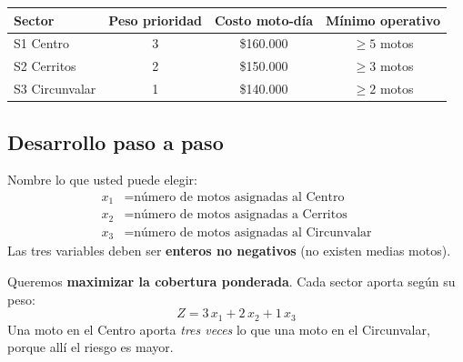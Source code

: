 \documentclass[11pt, a4paper]{article}
\begin{document}
\begin{center}
\begin{tabular}{@{}lccc@{}}
\toprule
\textbf{Sector} & \textbf{Peso prioridad} & \textbf{Costo moto-d\'ia} & \textbf{M\'inimo operativo} \\
\midrule
S1 Centro & 3 & \$160.000 & $\geq 5$ motos \\
S2 Cerritos & 2 & \$150.000 & $\geq 3$ motos \\
S3 Circunvalar & 1 & \$140.000 & $\geq 2$ motos \\
\bottomrule
\end{tabular}
\end{center}

\subsection{Desarrollo paso a paso}

\begin{cajaPaso}
Nombre lo que usted puede elegir:
\begin{align*}
x_1 &= \text{n\'umero de motos asignadas al Centro}\\
x_2 &= \text{n\'umero de motos asignadas a Cerritos}\\
x_3 &= \text{n\'umero de motos asignadas al Circunvalar}
\end{align*}
Las tres variables deben ser \textbf{enteros no negativos} (no existen medias motos).
\end{cajaPaso}

\begin{cajaPaso}
Queremos \textbf{maximizar la cobertura ponderada}. Cada sector aporta seg\'un su peso:
\begin{equation*}
\boxed{\; Z = 3\,x_1 + 2\,x_2 + 1\,x_3 \;}
\end{equation*}
Una moto en el Centro aporta \textit{tres veces} lo que una moto en el Circunvalar, porque all\'i el riesgo es mayor.
\end{cajaPaso}
\end{document}
